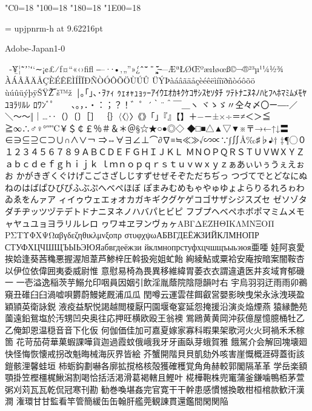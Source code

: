 %
%
%
%
\kcatcode"C0=18%
\kcatcode"100=18%
\kcatcode"180=18%
\kcatcode"1E00=18%

\font\upjpnrm = upjpnrm-h at 9.62216pt
\upjpnrm


Adobe-Japan1-0

 ‑¥̲̀¦˜̃ʼ’ʻ‘∼¡¢£⁄ƒ¤“«‹›ﬁﬂ
‒–·∙•‚„”»¿́ˆ̂¯̄̆̇̈˚̊¸̧̨̋̌
̶—ÆªŁØŒºæıłøœß­©¬®²³µ¹¼½¾
ÀÁÂÃÄÅÇÈÉÊËÌÍÎÏÐÑÒÓÔÕÖÙÚÛ
ÜÝÞàáâãäåçèéêëìíîïðñòóôõö
ùúûüýþÿŠŸŽ̅‾š™ž ￨｡｢｣､･ｦｧｨ
ｩｪｫｬｭｮｯｰｱｲｳｴｵｶｷｸｹｺｻｼｽｾｿﾀﾁ
ﾂﾃﾄﾅﾆﾇﾈﾉﾊﾋﾌﾍﾎﾏﾐﾑﾒﾓﾔﾕﾖﾗﾘﾙﾚ
ﾛﾜﾝﾞﾟ 　、。，．・：；？！゛゜´｀¨＾￣＿ヽ
ヾゝゞ〃仝々〆〇ー―‐／＼〜～‖｜…‥（）〔〕［］
｛｝〈〈〉〉《》「」『』【】＋−－±×÷＝≠＜＞≦
≧∞∴♂♀°′″℃￥＄￠￡％＃＆＊＠§☆★○●◎◇
◆□■△▲▽▼※〒→←↑↓〓∈∋⊆⊇⊂⊃∪∩∧∨￢
⇒⇔∀∃∠⊥⌒∂∇≡≒≪≫√∽∝∵∫∬Å‰♯♭♪†
‡¶◯０１２３４５６７８９ＡＢＣＤＥＦＧＨＩＪＫＬ
ＭＮＯＰＱＲＳＴＵＶＷＸＹＺａｂｃｄｅｆｇｈｉｊｋ
ｌｍｎｏｐｑｒｓｔｕｖｗｘｙｚぁあぃいぅうぇえぉお
かがきぎくぐけげこごさざしじすずせぜそぞただちぢっ
つづてでとどなにぬねのはばぱひびぴふぶぷへべぺほぼ
ぽまみむめもゃやゅゆょよらりるれろゎわゐゑをんァア
ィイゥウェエォオカガキギクグケゲコゴサザシジスズセ
ゼソゾタダチヂッツヅテデトドナニヌネノハバパヒビピ
フブプヘベペホボポマミムメモャヤュユョヨラリルレロ
ヮワヰヱヲンヴヵヶΑΒΓΔΕΖΗΘΙΚΛΜΝΞΟΠ
ΡΣΤΥΦΧΨΩαβγδεζηθικλμνξοπρ
στυφχψωАБВГДЕЁЖЗИЙКЛМНОПР
СТУФХЦЧШЩЪЫЬЭЮЯабвгдеёжзи
йклмнопрстуфхцчшщъыьэюя亜唖
娃阿哀愛挨姶逢葵茜穐悪握渥旭葦芦鯵梓圧斡扱宛姐虻飴
絢綾鮎或粟袷安庵按暗案闇鞍杏以伊位依偉囲夷委威尉惟
意慰易椅為畏異移維緯胃萎⾐衣謂違遺医井亥域育郁磯⼀
一壱溢逸稲茨芋鰯允印咽員因姻引飲淫胤蔭院陰隠韻吋右
宇烏⽻羽迂⾬雨卯鵜窺丑碓⾅臼渦嘘唄欝蔚鰻姥厩浦⽠瓜
閏噂云運雲荏餌叡営嬰影映曳栄永泳洩瑛盈穎頴英衛詠鋭
液疫益駅悦謁越閲榎厭円園堰奄宴延怨掩援沿演炎焔煙燕
猿縁艶苑薗遠鉛鴛塩於汚甥凹央奥往応押旺横欧殴王翁襖
鴬鴎⻩黄岡沖荻億屋憶臆桶牡⼄乙俺卸恩温穏⾳音下化仮
何伽価佳加可嘉夏嫁家寡科暇果架歌河⽕火珂禍⽲禾稼箇
花苛茄荷華菓蝦課嘩貨迦過霞蚊俄峨我⽛牙画臥芽蛾賀雅
餓駕介会解回塊壊廻快怪悔恢懐戒拐改魁晦械海灰界皆絵
芥蟹開階⾙貝凱劾外咳害崖慨概涯碍蓋街該鎧骸浬馨蛙垣
柿蛎鈎劃嚇各廓拡撹格核殻獲確穫覚⾓角赫較郭閣隔⾰革
学岳楽額顎掛笠樫橿梶鰍潟割喝恰括活渇滑葛褐轄且鰹叶
椛樺鞄株兜竃蒲釜鎌噛鴨栢茅萱粥刈苅⽡瓦乾侃冠寒刊勘
勧巻喚堪姦完官寛⼲干幹患感慣憾換敢柑桓棺款歓汗漢澗
潅環⽢甘監看竿管簡緩⽸缶翰肝艦莞観諌貫還鑑間閑関陥
